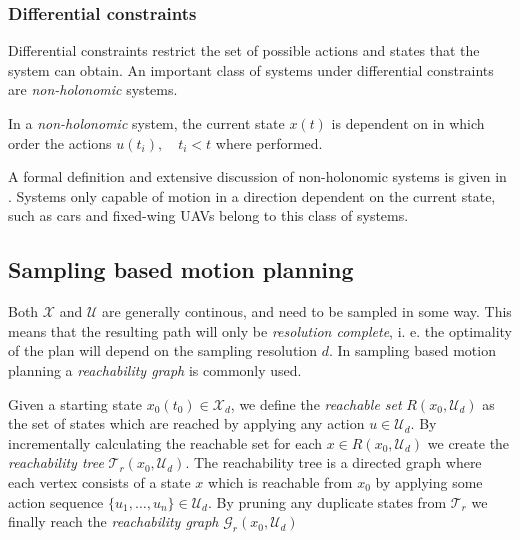 \subsubsection{Differential constraints}
Differential constraints restrict the set of possible actions and states that 
the system can obtain. An important class of systems under differential constraints 
are \textit{non-holonomic} systems.

\begin{definition}
    In a \textit{non-holonomic} system, the current state $x(t)$ is dependent 
    on in which order the actions $u(t_i),\quad t_i<t$ where performed.
\end{definition}

A formal definition and extensive discussion of non-holonomic systems is given 
in \cite[Chapter~15]{planning_algorithms}. Systems only capable of motion in a direction 
dependent on the current state, such as cars and fixed-wing UAVs belong to this class of systems.

\subsection{Sampling based motion planning}
Both $\mathcal{X}$ and $\mathcal{U}$ are generally continous, and need to be sampled 
in some way. This means that the resulting path will only be \textit{resolution complete}, i. e. 
the optimality of the plan will depend on the sampling resolution $d$. In sampling based
motion planning a \textit{reachability graph} is commonly used.

\begin{definition}
    Given a starting state $x_0(t_0)\in\mathcal{X}_d$, we define the \textit{reachable set} 
    $R(x_0, \mathcal{U}_d)$ as the set of states which are reached by applying any action $u\in\mathcal{U}_d$.
    By incrementally calculating the reachable set for each $x\in R(x_0, \mathcal{U}_d)$ we create the \textit{reachability tree} $\mathcal{T}_r(x_0, \mathcal{U}_d)$.
    The reachability tree is a directed graph where each vertex consists of a state $x$ which is reachable from $x_0$ by applying some action sequence 
    $\{u_1,\hdots,u_n\}\in\mathcal{U}_d$. By pruning any duplicate states from $\mathcal{T}_r$ we finally reach the \textit{reachability graph} $\mathcal{G}_r(x_0, \mathcal{U}_d)$
\end{definition}

